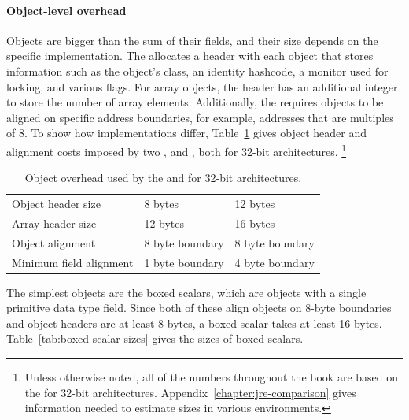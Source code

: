 \paragraph{Object-level overhead} Objects are bigger than the sum of their
fields, and their size depends on the specific \jre implementation. The \jre allocates a header with each object that
stores information such as the object's class, an identity hashcode, a monitor
used for locking, and various flags. For array objects, the header has an
additional integer to store the number of array elements. Additionally,  the
\jre requires objects to be aligned on specific address boundaries, for example,
addresses that are multiples of 8. To show how implementations differ,
Table~\ref{tab:object-overhead} gives object header and alignment costs imposed
by two \jres, \oracle \javasix and \ibm \javasix,
both for 32-bit architectures. \footnote{Unless otherwise noted, all of the
numbers throughout the book are based on the \oracle \jre for 32-bit architectures.
Appendix~\ref{chapter:jre-comparison} gives information needed to estimate
sizes in various environments.}
\begin{table}
  \centering
 \begin{tabular}{lll} \toprule
 	& \oracle \javasix & \ibm \javasix \\ \midrule
 	Object header size & 8 bytes & 12 bytes \\
 	Array header size & 12 bytes & 16 bytes \\
 	Object alignment & 8 byte boundary & 8 byte boundary \\
 	Minimum field alignment & 1 byte boundary & 4 byte boundary \\
 	\bottomrule
 \end{tabular}
  \caption{Object overhead used by the \oracle and \ibm \jres for 32-bit architectures.}
  \label{tab:object-overhead}
\end{table} 
   
The simplest objects are the boxed scalars, which are objects with a single
primitive data type field. Since both of these \jres align objects on
8-byte boundaries and object headers are at least 8 bytes, a boxed scalar takes
at least 16 bytes. Table~\ref{tab:boxed-scalar-sizes} gives the sizes of boxed
scalars.

